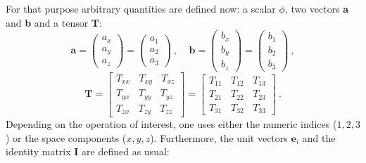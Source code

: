 \documentclass[MathematicsNumericsDerivationsAndOpenFOAM.tex]{subfiles}
\begin{document}
	For that purpose arbitrary quantities are defined now: a scalar $\phi$,
    two vectors \textbf{a} and \textbf{b} and a tensor \textbf{T}:
%
%
\begin{equation*}
  \textbf{a}
=
  \left(
  \begin{matrix}
    a_x \\ a_y \\ a_z
  \end{matrix}
  \right)
=
  \left(
  \begin{matrix}
    a_1 \\ a_2 \\ a_3
  \end{matrix}
  \right)
  ~,~~~~~
  \textbf{b}
=
  \left(
  \begin{matrix}
    b_x \\ b_y \\ b_z
  \end{matrix}
  \right)
=
  \left(
  \begin{matrix}
    b_1 \\ b_2 \\ b_3
  \end{matrix}
  \right)
  ~,
\end{equation*}
%
%
\begin{equation*}
  \textbf{T}
=
  \left[
  \begin{matrix}
   T_{xx} ~ ~ ~ ~ T_{xy} ~ ~ ~ ~ T_{xz} \\
   T_{yx} ~ ~ ~ ~ T_{yy} ~ ~ ~ ~ T_{yz} \\
   T_{zx} ~ ~ ~ ~ T_{zy} ~ ~ ~ ~ T_{zz}
  \end{matrix}
  \right]
=
  \left[
  \begin{matrix}
   T_{11} ~ ~ ~ ~ T_{12} ~ ~ ~ ~ T_{13} \\
   T_{21} ~ ~ ~ ~ T_{22} ~ ~ ~ ~ T_{23} \\
   T_{31} ~ ~ ~ ~ T_{32} ~ ~ ~ ~ T_{33}
  \end{matrix}
  \right] ~.
\end{equation*}
%
%
	Depending on the operation of interest, one uses either the numeric
    indices ($1, 2, 3$) or the space components ($x, y, z$). Furthermore,
    the unit vectors $\textbf{e}_i$ and the identity matrix $\textbf{I}$
    are defined as usual:
%
%
\end{document}
